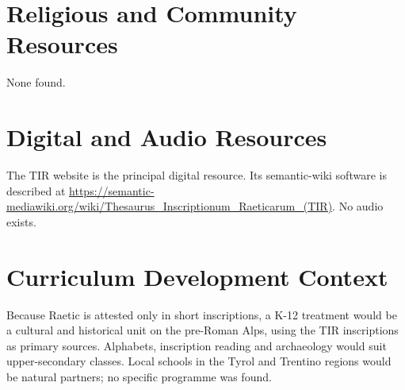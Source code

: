 \documentclass[12pt]{article}
\begin{document}
\section{Religious and Community Resources}
None found.

\section{Digital and Audio Resources}
The TIR website is the principal digital resource. Its semantic-wiki software is described at \url{https://semantic-mediawiki.org/wiki/Thesaurus_Inscriptionum_Raeticarum_(TIR)}. No audio exists.

\section{Curriculum Development Context}
Because Raetic is attested only in short inscriptions, a K-12 treatment would be a cultural and historical unit on the pre-Roman Alps, using the TIR inscriptions as primary sources. Alphabets, inscription reading and archaeology would suit upper-secondary classes. Local schools in the Tyrol and Trentino regions would be natural partners; no specific programme was found.
\end{document}
